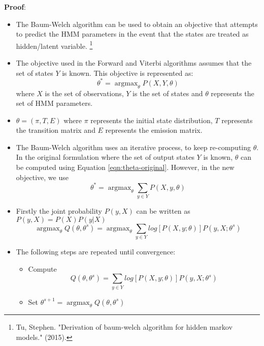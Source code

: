 \documentclass[parskip=half]{scrartcl}
\DeclareMathOperator*{\argmax}{argmax}
\begin{document}
    \textbf{Proof}:
    \begin{itemize}
        \item 
        The Baum-Welch algorithm can be used to obtain an objective that attempts to predict the HMM parameters in the event that the states are treated as hidden/latent variable. \footnote{Tu, Stephen. "Derivation of baum-welch algorithm for hidden markov models." (2015).}
        \item 
        The objective used in the Forward and Viterbi algorithms assumes that the set of states $Y$ is known. This objective is represented as:
        \begin{equation} \label{eqn:theta-original}
            \theta^* = \argmax_{\theta} P(X, Y, \theta)
        \end{equation}
        where $X$ is the set of observations, $Y$ is the set of states and $\theta$ represents the set of HMM parameters.
        \item 
        $\theta = (\pi, T, E)$ where $\pi$ represents the initial state distribution, $T$ represents the transition matrix and $E$ represents the emission matrix.
        \item 
        The Baum-Welch algorithm uses an iterative process, to keep re-computing $\theta$. In the original formulation where the set of output states $Y$ is known, $\theta$ can be computed using Equation \ref{eqn:theta-original}. However, in the new objective, we use
        \begin{equation*}
            \theta^* = \argmax_{\theta} \sum_{y \in Y} P(X, y, \theta)
        \end{equation*}
        \item 
        Firstly the joint probability $P(y,X)$ can be written as $P(y,X) = P(X) P(y|X)$
        $$\argmax_\theta Q(\theta, \theta^s) = \argmax_\theta \sum_{y \in Y} log [P(X,y;\theta)] P(y,X;\theta^s) $$ 
        \item 
        The following steps are repeated until convergence:
        \begin{itemize}
            \item 
            Compute 
            \begin{equation} \label{eqn:q-1}
                Q(\theta, \theta^s) = \sum_{y \in Y} log [P(X,y;\theta)] P(y,X;\theta^s)
            \end{equation}
            \item 
            Set $\theta^{s+1} = \argmax_\theta Q(\theta, \theta^s)$
        \end{itemize}

\end{itemize}
\end{document}
